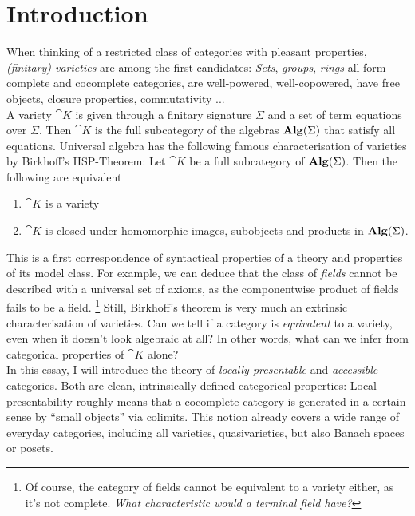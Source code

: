 \section*{Introduction}
{}

When thinking of a restricted class of categories with pleasant properties, \emph{(finitary) varieties} are among the first candidates: \emph{Sets}, \emph{groups}, \emph{rings} all form complete and cocomplete categories, are well-powered, well-copowered, have free objects, closure properties, commutativity ... \\

A variety $\cat K$ is given through a finitary signature $\Sigma$ and a set of term equations over $\Sigma$. Then $\cat K$ is the full subcategory of the algebras $\mathbf{Alg}(\Sigma)$ that satisfy all equations. Universal algebra has the following famous characterisation of varieties by Birkhoff's HSP-Theorem: Let $\cat K$ be a full subcategory of $\mathbf{Alg}(\Sigma)$. Then the following are equivalent
\begin{enumerate}
\item $\cat K$ is a variety
\item $\cat K$ is closed under \underline{h}omomorphic images, \underline{s}ubobjects and \underline{p}roducts in $\mathbf{Alg}(\Sigma)$.
\end{enumerate}
This is a first correspondence of syntactical properties of a theory and properties of its model class. For example, we can deduce that the class of \emph{fields} cannot be described with a universal set of axioms, as the componentwise product of fields fails to be a field. \footnote{Of course, the category of fields cannot be equivalent to a variety either, as it's not complete. \emph{What characteristic would a terminal field have?}}  Still, Birkhoff's theorem is very much an extrinsic characterisation of varieties. Can we tell if a category is \emph{equivalent} to a variety, even when it doesn't look algebraic at all? In other words, what can we infer from categorical properties of $\cat K$ alone? \\

In this essay, I will introduce the theory of \emph{locally presentable} and \emph{accessible} categories. Both are clean, intrinsically defined categorical properties: Local presentability roughly means that a cocomplete category is generated in a certain sense by ``small objects'' via colimits. This notion already covers a wide range of everyday categories, including all varieties, quasivarieties, but also Banach spaces or posets. \\

